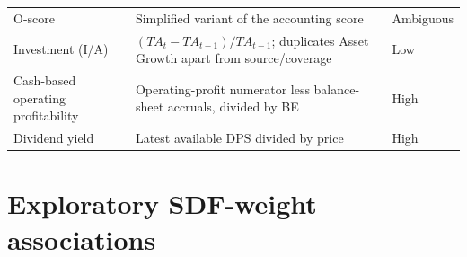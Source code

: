 \documentclass[12pt]{article}
\begin{document}
\begin{table}[htbp]
\begin{tabular}{@{}>{\raggedright\arraybackslash}p{3.4cm}>{\raggedright\arraybackslash}p{8.2cm}>{\raggedright\arraybackslash}p{2.1cm}@{}}
O-score & Simplified variant of the \citet{ohlson1980} accounting score & Ambiguous \\
Investment (I/A) & $(TA_t-TA_{t-1})/TA_{t-1}$; duplicates Asset Growth apart from source/coverage & Low \\
Cash-based operating profitability & Operating-profit numerator less balance-sheet accruals, divided by BE & High \\
Dividend yield & Latest available DPS divided by price & High \\
\bottomrule
\end{tabular}
\end{table}

\clearpage
\section{Exploratory SDF-weight associations}\label{app:loadings}
\end{document}

